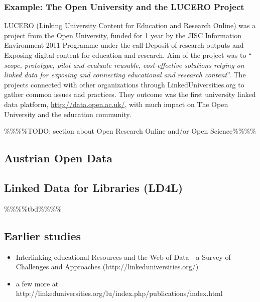 \subsubsection{Example: The Open University and the LUCERO Project}
LUCERO (Linking University Content for Education and Research Online) was a project from the Open University, funded for 1 year by the JISC Information Environment 2011 Programme under the call Deposit of research outputs and Exposing digital content for education and research. Aim of the project was to "` \textit{ scope, prototype, pilot and evaluate reusable, cost-effective solutions relying on linked data for exposing and connecting educational and research content}"'.\citet{url:lucero} The projects connected with other organizations through LinkedUniversities.org to gather common issues and practices. They outcome was the first university linked data platform, \url{http://data.open.ac.uk/}, with much impact on The Open University and the education community.

\%\%\%\%TODO: section about Open Research Online and/or Open Science\%\%\%\%

\subsection{Austrian Open Data}
\subsection{Linked Data for Libraries (LD4L)\label{ld-libraries}}

\%\%\%\%tbd\%\%\%\%

\subsection{Earlier studies}
\begin{itemize}
	\item Interlinking educational Resources and the Web of Data - a Survey of Challenges and Approaches (http://linkeduniversities.org/)
	\item a few more at http://linkeduniversities.org/lu/index.php/publications/index.html
	
	
\end{itemize}